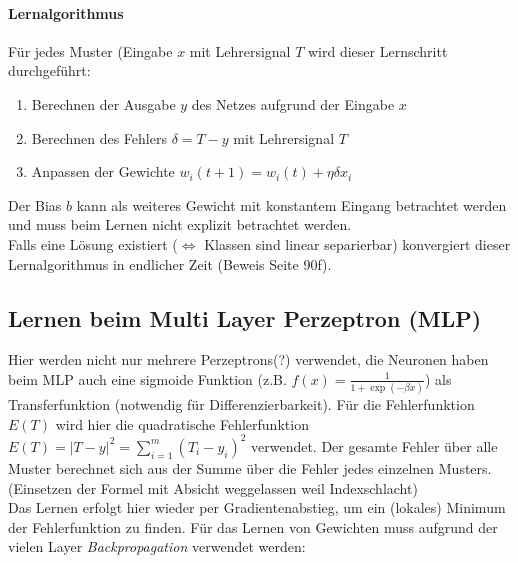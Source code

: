 \paragraph{Lernalgorithmus}
Für jedes Muster (Eingabe $x$ mit Lehrersignal $T$ wird dieser Lernschritt durchgeführt:
\begin{enumerate}
    \item Berechnen der Ausgabe $y$ des Netzes aufgrund der Eingabe $x$
    \item Berechnen des Fehlers $\delta = T - y$ mit Lehrersignal $T$
    \item Anpassen der Gewichte $w_i(t+1) = w_i(t) + \eta \delta x_i$
\end{enumerate}
Der Bias $b$ kann als weiteres Gewicht mit konstantem Eingang betrachtet werden und muss beim Lernen nicht explizit betrachtet werden.\\
Falls eine Lösung existiert ($\iff$ Klassen sind linear separierbar) konvergiert dieser Lernalgorithmus in endlicher Zeit
(Beweis Seite 90f).

\subsection{Lernen beim Multi Layer Perzeptron (MLP)}
Hier werden nicht nur mehrere Perzeptrons(?) verwendet, die Neuronen haben beim MLP auch eine sigmoide Funktion
(z.B. $f(x) = \frac{1}{1+\exp{(-\beta x)}}$) als Transferfunktion (notwendig für Differenzierbarkeit).
Für die Fehlerfunktion $E(T)$ wird hier die quadratische Fehlerfunktion $E(T)=|T-y|^2=\sum_{i=1}^m (T_i-y_i)^2$ verwendet.
Der gesamte Fehler über alle Muster berechnet sich aus der Summe über die Fehler jedes einzelnen Musters.
(Einsetzen der Formel mit Absicht weggelassen weil Indexschlacht)\\
Das Lernen erfolgt hier wieder per Gradientenabstieg, um ein (lokales) Minimum der Fehlerfunktion zu finden.
Für das Lernen von Gewichten muss aufgrund der vielen Layer \emph{Backpropagation} verwendet werden:

